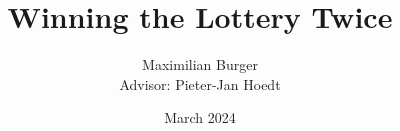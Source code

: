 \documentclass{article}
\title{Winning the Lottery Twice}
\author{Maximilian Burger\\{\small Advisor: Pieter-Jan Hoedt}}
\date{March 2024}
\begin{document}
\sffamily
\maketitle







\printbibliography
\end{document}
